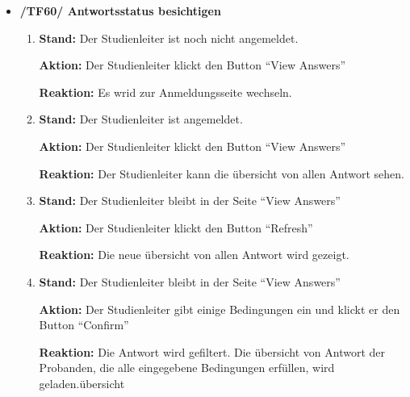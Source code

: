 \documentclass[a4paper]{scrreprt}
\begin{document}
\begin{itemize}
                \item \textbf{/TF60/ Antwortsstatus besichtigen}
                    \begin{enumerate}
                        \item \par \textbf{Stand: } Der \gls{Studienleiter} ist noch nicht angemeldet.
                              \par \textbf{Aktion: } Der \gls{Studienleiter} klickt den Button ``View Answers''
                              \par \textbf{Reaktion: } Es wrid zur Anmeldungsseite wechseln.

                        \item \par \textbf{Stand: } Der \gls{Studienleiter} ist angemeldet.
                              \par \textbf{Aktion: } Der \gls{Studienleiter} klickt den Button ``View Answers''
                              \par \textbf{Reaktion: } Der \gls{Studienleiter} kann die \"ubersicht von allen Antwort sehen.

                        \item \par \textbf{Stand: } Der \gls{Studienleiter} bleibt in der Seite ``View Answers''
                              \par \textbf{Aktion: } Der \gls{Studienleiter} klickt den Button ``Refresh''
                              \par \textbf{Reaktion: } Die neue \"ubersicht von allen Antwort wird gezeigt.

                        \item \par \textbf{Stand: } Der \gls{Studienleiter} bleibt in der Seite ``View Answers''
                              \par \textbf{Aktion: } Der \gls{Studienleiter} gibt einige Bedingungen ein und klickt er den Button ``Confirm''
                              \par \textbf{Reaktion: } Die Antwort wird gefiltert. Die \"ubersicht von Antwort der \gls{Proband}en, die alle eingegebene Bedingungen erf\"ullen, wird geladen.\"ubersicht
                    \end{enumerate}


\end{itemize}
\end{document}
